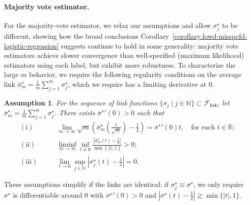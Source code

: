 \documentclass[11pt]{article}
\newcommand{\ha}[1]{\textcolor{ha}{[HA: #1]}}
\newcommand{\R}{\mathbb{R}} %
\newcommand{\N}{\mathbb{N}} %
\newcommand{\prn}[1]{\left({#1}\right)} %
\newcommand{\wb}[1]{\overline{#1}}
\newcommand{\flink}{\mathcal{F}_{\mathsf{link}}}
\newcommand{\<}{\langle} %
\renewcommand{\>}{\rangle}
\newcommand{\half}{\frac{1}{2}}
\newcommand{\opt}{^\star}
\newtheorem{assumption}{Assumption}
\begin{document}
\paragraph{Majority vote estimator.}
For the majority-vote estimator, we relax our assumptions and allow
$\sigma_j\opt$ to be different, showing how the broad conclusions
Corollary~\ref{corollary:lowd-misspcfd-logistic-regression} suggests
continue to hold in some generality: majority vote estimators achieve slower
convergence than well-specified (maximum likelihood) estimators using each
label, but exhibit more robustness.
To characterize the large $m$
behavior, we require the following regularity conditions on
the average link $\wb{\sigma}_m\opt = \frac{1}{m} \sum_{j=1}^m \sigma_j\opt$,
which we require has a limiting derivative at $0$.

\begin{assumption} \label{assumption:condition-misspcfd-link-majority-vote}
  For the sequence of link functions $\{\sigma_j \mid j \in \mathbb{N}\}
  \subset \flink$, let $\wb{\sigma}_m\opt = \frac{1}{m} \sum_{j=1}^m
  \sigma_j\opt$. There exists ${\wb{\sigma}\opt}'(0) >0$ such that
  \begin{subequations}
    \begin{align}
      \bm{\mathrm{(i)}} \qquad  & \lim_{m \to \infty} \sqrt{m} \prn{\wb{\sigma}_m\opt\prn{\frac{t}{\sqrt m}} - \frac 1 2} = {\wb{\sigma}\opt}'(0) t   , \quad \textrm{for each } t \in \R  ; \label{ass:misspcfd-link-1} \\
      \bm{\mathrm{(ii)}} \qquad &\liminf_{m \to \infty} \inf_{t \neq 0} \frac{\left|\wb{\sigma}_m\opt(t) - \frac 1 2 \right|}{\min \left\{|t|, 1\right\}} > 0  ; \label{ass:misspcfd-link-2} \\
      \bm{\mathrm{(iii)}} \qquad &\lim_{t \to 0} \sup_{j \in \N}
      \left|\sigma_j\opt(t) - \frac 1 2 \right| = 0  . \label{ass:misspcfd-link-3}
    \end{align}
  \end{subequations}
\end{assumption}
\noindent
These assumptions simplify if the links are identical:
if $\sigma_j\opt \equiv \sigma\opt$,
we only require $\sigma\opt$ is differentiable around
$0$ with ${\sigma\opt}'(0) >0$ and $|\sigma\opt(t) - \half|
\gtrsim \min\{|t|, 1\}$.

\end{document}
